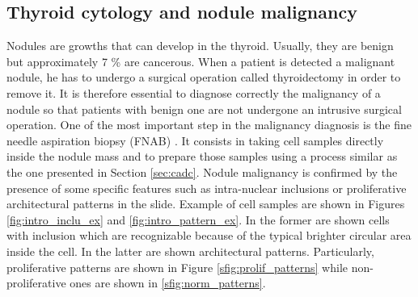 \subsection{Thyroid cytology and nodule malignancy}
\label{ssec:intro_thyroid_case}
Nodules are growths that can develop in the thyroid. Usually, they are benign but approximately 7 \% are cancerous\cite{gopinath2013computer}. When a patient is detected a malignant nodule, he has to undergo a surgical operation called thyroidectomy in order to remove it. It is therefore essential to diagnose correctly the malignancy of a nodule so that patients with benign one are not undergone an intrusive surgical operation. One of the most important step in the malignancy diagnosis is the fine needle aspiration biopsy (FNAB) \cite{bomeli2010evaluation}. It consists in taking cell samples directly inside the nodule mass and to prepare those samples using a process similar as the one presented in Section \ref{sec:cadc}. Nodule malignancy is confirmed by the presence of some specific features such as intra-nuclear inclusions or proliferative architectural patterns in the slide. Example of cell samples are shown in Figures \ref{fig:intro_inclu_ex} and \ref{fig:intro_pattern_ex}. In the former are shown cells with inclusion which are recognizable because of the typical brighter circular area inside the cell. In the latter are shown architectural patterns. Particularly, proliferative patterns are shown in Figure \ref{sfig:prolif_patterns} while non-proliferative ones are shown in \ref{sfig:norm_patterns}. 

